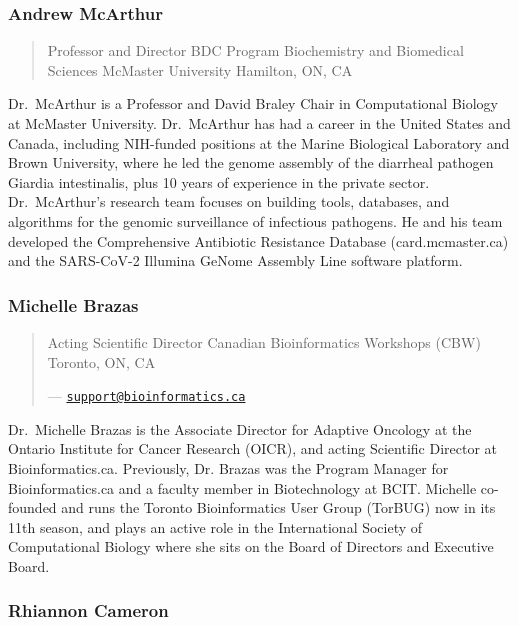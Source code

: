 \documentclass[
]{book}
\begin{document}
\subsubsection{Andrew McArthur}\label{andrew-mcarthur}

\begin{quote}
Professor and Director BDC Program
Biochemistry and Biomedical Sciences
McMaster University
Hamilton, ON, CA
\end{quote}

Dr.~McArthur is a Professor and David Braley Chair in Computational Biology at McMaster
University. Dr.~McArthur has had a career in the United States and Canada, including
NIH-funded positions at the Marine Biological Laboratory and Brown University, where he led
the genome assembly of the diarrheal pathogen Giardia intestinalis, plus 10 years of experience
in the private sector. Dr.~McArthur's research team focuses on building tools, databases, and
algorithms for the genomic surveillance of infectious pathogens. He and his team developed the
Comprehensive Antibiotic Resistance Database (card.mcmaster.ca) and the SARS-CoV-2
Illumina GeNome Assembly Line software platform.

\subsubsection{Michelle Brazas}\label{michelle-brazas}

\begin{quote}
Acting Scientific Director
Canadian Bioinformatics Workshops (CBW)
Toronto, ON, CA

--- \href{mailto:support@bioinformatics.ca}{\nolinkurl{support@bioinformatics.ca}}
\end{quote}

Dr.~Michelle Brazas is the Associate Director for Adaptive Oncology at the Ontario Institute for
Cancer Research (OICR), and acting Scientific Director at Bioinformatics.ca. Previously, Dr.
Brazas was the Program Manager for Bioinformatics.ca and a faculty member in Biotechnology
at BCIT. Michelle co-founded and runs the Toronto Bioinformatics User Group (TorBUG) now in
its 11th season, and plays an active role in the International Society of Computational Biology
where she sits on the Board of Directors and Executive Board.

\subsubsection{Rhiannon Cameron}\label{rhiannon-cameron}
\end{document}
